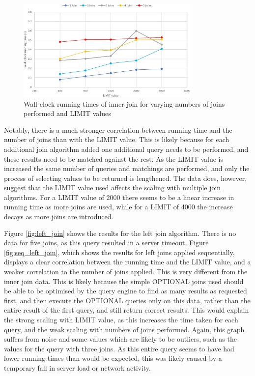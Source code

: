 \documentclass[10pt,a4paper]{article}
\begin{document}
	\begin{figure}[h!]
		\centering
		\includegraphics[width=0.8\textwidth]{figures/graph_inner_join}
		\caption{Wall-clock running times of inner join for varying numbers of joins performed and LIMIT values}
		\label{fig:inner_join}
	\end{figure}
	
	Notably, there is a much stronger correlation between running time and the number of joins than with the LIMIT value. This is likely because for each additional join algorithm added one additional query needs to be performed, and these results need to be matched against the rest. As the LIMIT value is increased the same number of queries and matchings are performed, and only the process of selecting values to be returned is lengthened. The data does, however, suggest that the LIMIT value used affects the scaling with multiple join algorithms. For a LIMIT value of 2000 there seems to be a linear increase in running time as more joins are used, while for a LIMIT of 4000 the increase decays as more joins are introduced.
	
	Figure \ref{fig:left_join} shows the results for the left join algorithm. There is no data for five joins, as this query resulted in a server timeout. Figure \ref{fig:seq_left_join}, which shows the results for left joins applied sequentially, displays a clear correlation between the running time and the LIMIT value, and a weaker correlation to the number of joins applied. This is very different from the inner join data. This is likely because the simple OPTIONAL joins used should be able to be optimised by the query engine to find as many results as requested first, and then execute the OPTIONAL queries only on this data, rather than the entire result of the first query, and still return correct results. This would explain the strong scaling with LIMIT value, as this increases the time taken for each query, and the weak scaling with numbers of joins performed. Again, this graph suffers from noise and some values which are likely to be outliers, such as the values for the query with three joins. As this entire query seems to have had lower running times than would be expected, this was likely caused by a temporary fall in server load or network activity.
	
\end{document}
